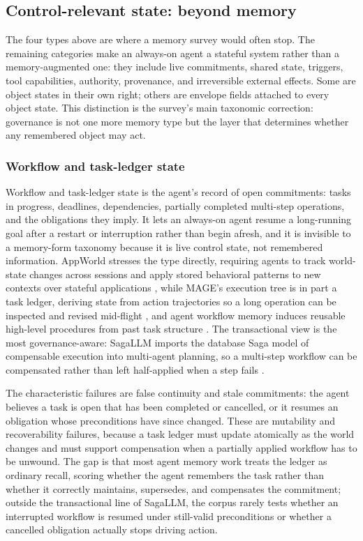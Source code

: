 \subsection{Control-relevant state: beyond memory}

The four types above are where a memory survey would often stop. The remaining categories make an always-on agent a stateful system rather than a memory-augmented one: they include live commitments, shared state, triggers, tool capabilities, authority, provenance, and irreversible external effects. Some are object states in their own right; others are envelope fields attached to every object state. This distinction is the survey's main taxonomic correction: governance is not one more memory type but the layer that determines whether any remembered object may act.

\subsubsection{Workflow and task-ledger state}

Workflow and task-ledger state is the agent's record of open commitments: tasks in progress, deadlines, dependencies, partially completed multi-step operations, and the obligations they imply. It lets an always-on agent resume a long-running goal after a restart or interruption rather than begin afresh, and it is invisible to a memory-form taxonomy because it is live control state, not remembered information. AppWorld stresses the type directly, requiring agents to track world-state changes across sessions and apply stored behavioral patterns to new contexts over stateful applications \citep{trivedi-etal-2024-appworld}, while MAGE's execution tree is in part a task ledger, deriving state from action trajectories so a long operation can be inspected and revised mid-flight \citep{chen2026mage}, and agent workflow memory induces reusable high-level procedures from past task structure \citep{wang2024agentworkflowmemory}. The transactional view is the most governance-aware: SagaLLM imports the database Saga model of compensable execution into multi-agent planning, so a multi-step workflow can be compensated rather than left half-applied when a step fails \citep{chang2025sagallm}.

The characteristic failures are false continuity and stale commitments: the agent believes a task is open that has been completed or cancelled, or it resumes an obligation whose preconditions have since changed. These are mutability and recoverability failures, because a task ledger must update atomically as the world changes and must support compensation when a partially applied workflow has to be unwound. The gap is that most agent memory work treats the ledger as ordinary recall, scoring whether the agent remembers the task rather than whether it correctly maintains, supersedes, and compensates the commitment; outside the transactional line of SagaLLM, the corpus rarely tests whether an interrupted workflow is resumed under still-valid preconditions or whether a cancelled obligation actually stops driving action.

